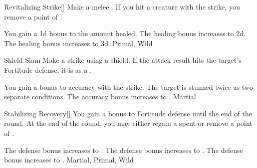 \lowercase{\hypertarget{maneuver:Revitalizing Strike}{}}\label{maneuver:Revitalizing Strike}
\hypertarget{maneuver:Revitalizing Strike}{}
\begin{apability}{Revitalizing Strike}[]
Make a melee .
If you hit a creature with the strike, you remove a point of .

\rankline
{} You gain a \plus1d bonus to the amount healed.
 The healing bonus increases to \plus2d.
 The healing bonus increases to \plus3d.
 Primal, Wild
\end{apability}
\vspace{0.25em}



\lowercase{\hypertarget{maneuver:Shield Slam}{}}\label{maneuver:Shield Slam}
\hypertarget{maneuver:Shield Slam}{}
\begin{apability}{Shield Slam}
Make a strike using a shield.
If the attack result hits the target's Fortitude defense,
it is  as a .

\rankline
{} You gain a  bonus to accuracy with the strike.
 The target is stunned twice as two separate conditions.
 The accuracy bonus increases to .
 Martial
\end{apability}
\vspace{0.25em}



\lowercase{\hypertarget{maneuver:Stabilizing Recovery}{}}\label{maneuver:Stabilizing Recovery}
\hypertarget{maneuver:Stabilizing Recovery}{}
\begin{freeability}{Stabilizing Recovery}[]
You gain a  bonus to Fortitude defense until the end of the round.
At the end of the round, you may either regain a spent  or remove a point of .

\rankline
{} The defense bonus increases to .
 The defense bonus increases to .
 The defense bonus increases to .
 Martial, Primal, Wild
\end{freeability}
\vspace{0.25em}



